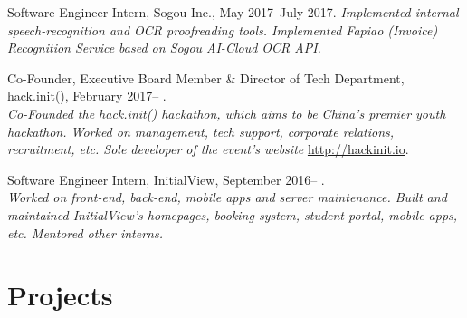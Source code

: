 \documentclass[letterpaper]{article}
\renewenvironment{itemize}{
  \begin{list}{}{
    \setlength{\leftmargin}{1.5em}
  }
}{
  \end{list}
}
\begin{document}
\begin{itemize}
  \item Software Engineer Intern, Sogou Inc., May 2017--July 2017.
  \emph{Implemented internal speech-recognition and OCR proofreading tools. Implemented Fapiao (Invoice) Recognition Service based on Sogou AI-Cloud OCR API.}

  \item Co-Founder, Executive Board Member \& Director of Tech Department, hack.init(), February 2017-- .\\
  \emph{Co-Founded the hack.init() hackathon, which aims to be China's premier youth hackathon. Worked on management, tech support, corporate relations, recruitment, etc. Sole developer of the event's website }\url{http://hackinit.io}{.}

  \item Software Engineer Intern, InitialView, September 2016-- .\\
  \emph{Worked on front-end, back-end, mobile apps and server maintenance. Built and maintained InitialView's homepages, booking system, student portal, mobile apps, etc. Mentored other interns.}
\end{itemize}


\section*{Projects}
\end{document}
